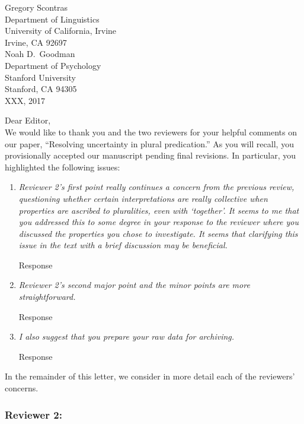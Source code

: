 \documentclass[12pt]{article}
\newcommand{\ben}{\begin{enumerate}}
\newcommand{\een}{\end{enumerate}}
\begin{document}
{\flushright

\vspace{25pt}
Gregory Scontras\\
Department of Linguistics\\
University of California, Irvine\\
Irvine, CA 92697\\[10pt]

Noah D.~Goodman\\
Department of Psychology\\
Stanford University\\
Stanford, CA 94305\\[20pt]

\noindent XXX, 2017\\[20pt]}


\noindent Dear Editor,\\

\noindent We would like to thank you and the two reviewers for your helpful comments on our paper, ``Resolving uncertainty in plural predication.'' As you will recall, you provisionally accepted our manuscript pending final revisions. In particular, you highlighted the following issues: 

\ben

\item \emph{Reviewer 2's first point really continues a concern from the previous review, questioning whether certain interpretations are really collective when properties are ascribed to pluralities, even with `together'.  It seems to me that you addressed this to some degree in your response to the reviewer where you discussed the properties you chose to investigate.  It seems that clarifying this issue in the text with a brief discussion may be beneficial.}

Response

\item \emph{Reviewer 2's second major point and the minor points are more straightforward.}

Response

\item \emph{I also suggest that you prepare your raw data for archiving.}

Response


\een


\noindent In the remainder of this letter, we consider in more detail each of the reviewers' concerns.


\newpage

\subsubsection*{Reviewer 2:}
\end{document}

